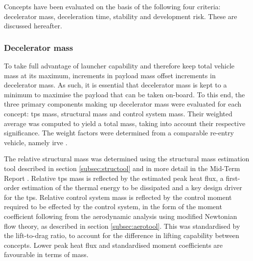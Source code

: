 Concepts have been evaluated on the basis of the following four criteria: decelerator mass, deceleration time, stability and development risk. These are discussed hereafter.

\subsubsection{Decelerator mass}
To take full advantage of launcher capability and therefore keep total vehicle mass at its maximum, increments in payload mass offset increments in decelerator mass. As such, it is essential that decelerator mass is kept to a minimum to maximise the payload that can be taken on-board. To this end, the three primary components making up decelerator mass were evaluated for each concept: \gls{tps} mass, structural mass and control system mass. Their weighted average was computed to yield a total mass, taking into account their respective significance. The weight factors were determined from a comparable re-entry vehicle, namely \gls{irve} \cite{Hughes2005}.

The relative structural mass was determined using the structural mass estimation tool described in section \ref{subsec:structool} and in more detail in the Mid-Term Report \cite[p.47-66]{Balasooriyan2015b}. Relative \gls{tps} mass is reflected by the estimated peak heat flux, a first-order estimation of the thermal energy to be dissipated and a key design driver for the \gls{tps}. Relative control system mass is reflected by the control moment required to be effected by the control system, in the form of the moment coefficient following from the aerodynamic analysis using modified Newtonian flow theory, as described in section \ref{subsec:aerotool}. This was standardised by the lift-to-drag ratio, to account for the difference in lifting capability between concepts. Lower peak heat flux and standardised moment coefficients are favourable in terms of mass. 

